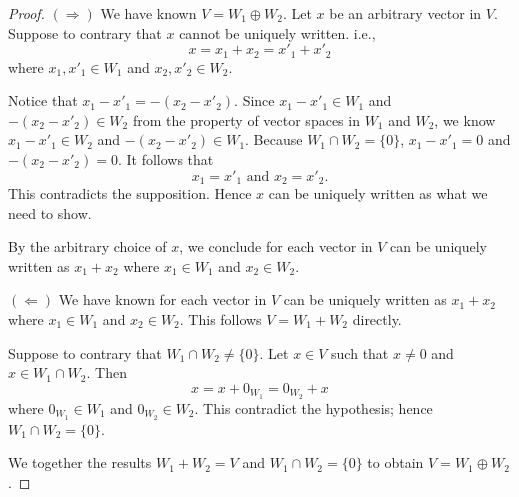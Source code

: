 \begin{Exercise}
	\begin{proof}
		$(\Longrightarrow)$
		We have known $V = W_1\oplus W_2$. Let $x$ be an arbitrary vector in $V$. Suppose to contrary that $x$ cannot be uniquely written. i.e.,
		$$
		x = x_1+x_2 = x'_1+x'_2
		$$
		where $x_1, x'_1\in W_1$ and $x_2, x'_2\in W_2$.
		
		Notice that $x_1-x'_1 = -(x_2-x'_2)$. Since $x_1-x'_1\in W_1$ and $-(x_2-x'_2)\in W_2$ from the property of vector spaces in $W_1$ and $W_2$, we know $x_1-x'_1\in W_2$ and $-(x_2-x'_2)\in W_1$. Because $W_1\cap W_2 = \{0\}$, $x_1-x'_1=0$ and $-(x_2-x'_2)=0$. It follows that
		$$
		x_1 = x'_1\text{ and } x_2 = x'_2.
		$$
		This contradicts the supposition. Hence $x$ can be uniquely written as what we need to show.
		
		By the arbitrary choice of $x$, we conclude for each vector in $V$ can be uniquely written as $x_1+x_2$ where $x_1\in W_1$ and $x_2\in W_2$.
		
		\vspace{2ex}
		
		$(\Longleftarrow)$
		We have known for each vector in $V$ can be uniquely written as $x_1+x_2$ where $x_1\in W_1$ and $x_2\in W_2$. This follows $V = W_1+W_2$ directly.
		
		Suppose to contrary that $W_1\cap W_2\neq \{0\}$. Let $x\in V$ such that $x\neq 0$ and $x\in W_1\cap W_2$. Then
		$$
		x = x + 0_{W_1} = 0_{W_2} + x
		$$
		where $0_{W_1}\in W_1$ and $0_{W_2}\in W_2$. This contradict the hypothesis; hence $W_1\cap W_2= \{0\}$.
		
		We together the results $W_1+W_2=V$ and $W_1\cap W_2=\{0\}$ to obtain $V=W_1\oplus W_2$.
	\end{proof}
\end{Exercise}